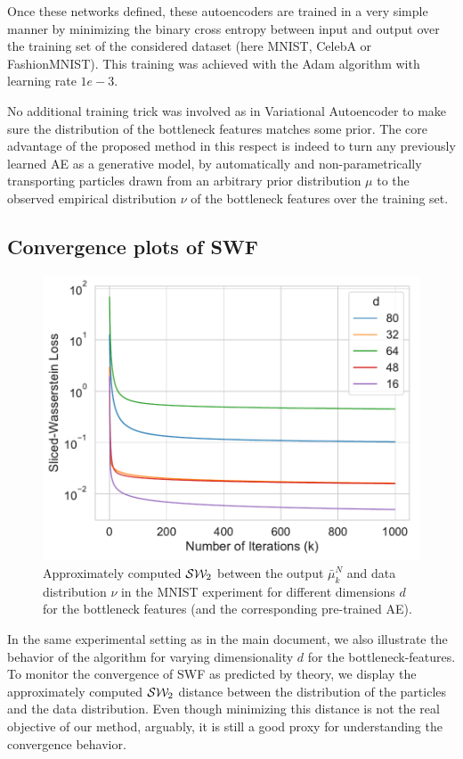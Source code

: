 Once these networks defined, these autoencoders are trained in a very simple manner by minimizing the binary cross entropy between input and output over the training set of the considered dataset (here MNIST, CelebA or FashionMNIST). This training was achieved with the Adam algorithm \cite{kingma2014adam} with learning rate $1e-3$.

No additional training trick was involved as in Variational Autoencoder \cite{kingma2013VAE} to make sure the distribution of the bottleneck features matches some prior. The core advantage of the proposed method in this respect is indeed to turn any previously learned AE as a generative model, by automatically and non-parametrically transporting particles drawn from an arbitrary prior distribution $\mu$ to the observed empirical distribution $\nu$ of the bottleneck features over the training set.

\subsection{Convergence plots of SWF}

\begin{figure}
\begin{centering}
\includegraphics[width=0.5\columnwidth]{figures/iterations.pdf}
\par\end{centering}
\caption{Approximately computed ${\cal S}{\cal W}_2$ between the output $\bar{\mu}_{k}^{N}$ and data distribution $\nu$ in the MNIST experiment for different dimensions $d$ for the bottleneck features (and the corresponding pre-trained AE).
\label{fig:supptoy_sw}}
\end{figure}

In the same experimental setting as in the main document, we also illustrate the behavior of the algorithm for varying dimensionality $d$ for the bottleneck-features. To monitor the convergence of SWF as predicted by theory, we display the approximately computed ${\cal S}{\cal W}_2$ distance between the distribution of the particles and the data distribution. Even though minimizing this distance is not the real objective of our method, arguably, it is still a good proxy for understanding the convergence behavior.


